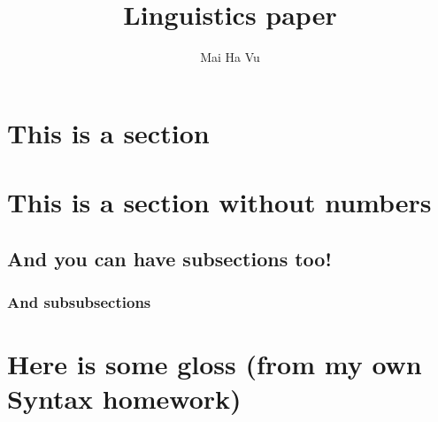 \documentclass[english, 11pt]{article}
\newcommand{\vs}{\vspace{11pt}}		%
\begin{document}
\rfoot{\thepage}	%
\cfoot{}


\title{Linguistics paper}	%
\author{Mai Ha Vu}		%


\maketitle		%

\section{This is a section} %

\section*{This is a section without numbers}

\subsection{And you can have subsections too!}

\subsubsection{And subsubsections}

	
	
	
	
	
	\vs 
	
\section{Here is some gloss (from my own Syntax homework)}
\end{document}
